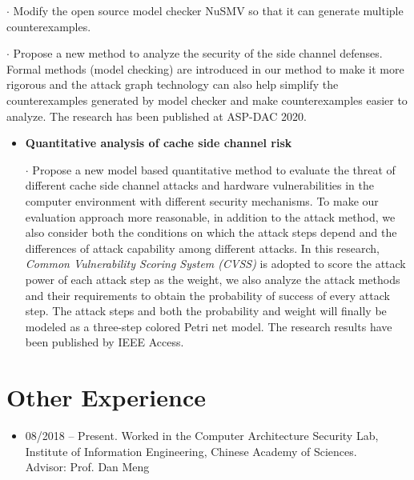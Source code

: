 \documentclass[11pt]{article}
\begin{document}
{\begin{itemize}
$\cdot$ Modify the open source model checker NuSMV so that it can generate multiple counterexamples.\\
\vspace{-.3cm}

$\cdot$ Propose a new method to analyze the security of the side channel defenses. Formal methods (model checking) are introduced in our method to make it more rigorous and the attack graph technology can also help simplify the counterexamples generated by model checker and make counterexamples easier to analyze. The research has been published at ASP-DAC 2020.
\end{itemize}


\begin{itemize}
\item {\bf Quantitative analysis of cache side channel risk }\\
\vspace{-.3cm}

$\cdot$ Propose a new model based quantitative method to evaluate the threat of different cache side channel attacks and hardware vulnerabilities in the computer environment with different security mechanisms. To make our evaluation approach more reasonable, in addition to the attack method, we also consider both the conditions on which the attack steps depend and the differences of attack capability among different attacks. In this research, \emph{Common Vulnerability Scoring System (CVSS)} is adopted to score the attack power of each attack step as the weight, we also analyze the attack methods and their requirements to obtain the probability of success of every attack step. The attack steps and both the probability and weight will finally be modeled as a three-step colored Petri net model. The research results have been published by IEEE Access. \\
\end{itemize}


\section*{Other Experience}
\begin{itemize}

\item 08/2018 -- Present. Worked in the Computer Architecture Security Lab, Institute of Information Engineering, Chinese Academy of Sciences. \\
Advisor: Prof. Dan Meng


\end{itemize}}
\end{document}

